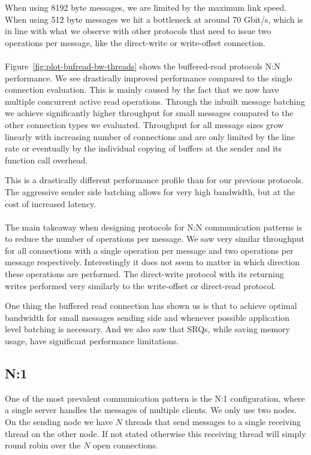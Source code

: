 When using 8192 byte messages, we are limited by the maximum link speed. When using 512 byte messages we hit a bottleneck at
around 70 Gbit/s, which is in line with what we observe with other protocols that need to issue two operations per message, 
like the direct-write or write-offset connection.



\paragraph{} Figure~\ref{fig:plot-bufread-bw-threads} shows the buffered-read protocols N:N performance. We see drastically 
improved performance compared to the single connection evaluation. This is mainly caused by the fact that we now have multiple
concurrent active read operations. Through the inbuilt message batching we achieve  significantly higher throughput for small
messages compared to the other connection types we evaluated. Throughput for all message sizes grow linearly with increasing 
number of connections and are only limited by the line rate or eventually by the individual copying of buffers at the sender 
and its function call overhead.

This is a drastically different performance profile than for our previous protocols. The aggressive sender side batching allows
for very high bandwidth, but at the cost of increased latency.


\paragraph{} The main takeaway when designing protocols for N:N communication patterns is to reduce the number of operations
per message. We saw very similar throughput for all connections with a single operation per message and two operations per
message respectively. Interestingly it does not seem to matter in which direction these operations are performed. The 
direct-write protocol with its returning writes performed very similarly to the write-offset or direct-read protocol.

One thing the buffered read connection has shown us is that to achieve optimal bandwidth for small messages sending side and
whenever possible application level batching is necessary. And we also saw that SRQs, while saving memory usage, have 
significant performance limitations.



\pagebreak
\subsection{N:1}
One of the most prevalent communication pattern is the N:1 configuration, where a single server handles the messages
of multiple clients. We only use two nodes. On the sending node we have $N$ threads that send messages to a
single receiving thread on the other node. If not stated otherwise this receiving thread will simply 
round robin over the $N$ open connections. 

